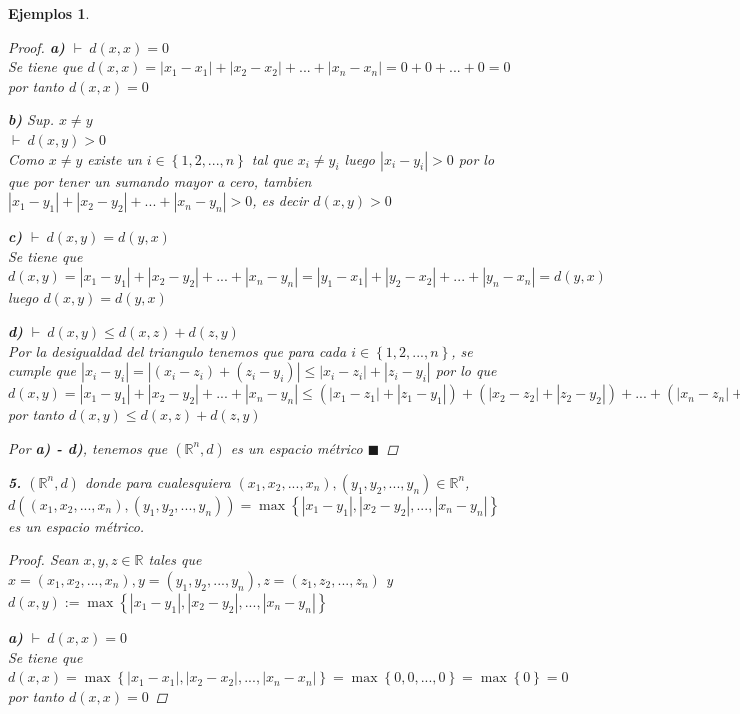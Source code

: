 \documentclass[oneside]{book} %
\theoremstyle{Teorema}
\theoremstyle{Ejemplos}
\newtheorem{Ejemplos}[Definicion]{Ejemplos}
\theoremstyle{[Obs]}
\newcommand{\abs}[1]{\left|#1\right|} %
\renewcommand{\{}{\left\lbrace} %
\renewcommand{\}}{\right\rbrace} %
\newcommand{\R}{\mathbb{R}} %
\newcommand{\Rn}{\mathbb{R}^n} %
\renewcommand{\qed}{$\blacksquare$} %
\newcommand{\pd}{$\vdash\ $} %
\begin{document}
\begin{Ejemplos}
\begin{proof}
					\textbf{a)} \pd $d(x, x) = 0$ \\
					Se tiene que $d(x, x) = \abs{x_1 - x_1} + \abs{x_2 - x_2} + ... + \abs{x_n - x_n} = 0 + 0 + ... + 0 = 0$ por tanto $d(x, x) = 0$ 

					\textbf{b)} Sup. $x \neq y$ \\
					\pd $d(x, y) > 0$ \\
					Como $x \neq y$ existe un $i \in \{ 1, 2, ..., n \}$ tal que $x_i \neq y_i$ luego $\abs{x_i - y_i} > 0$ por lo que por tener un sumando mayor a cero, tambien $\abs{x_1 - y_1} + \abs{x_2 - y_2} + ... + \abs{x_n - y_n} > 0$, es decir $d(x, y) > 0$ 

					\textbf{c)} \pd $d(x, y) = d(y, x)$ \\
					Se tiene que $d(x, y) = \abs{x_1 - y_1} + \abs{x_2 - y_2} + ... + \abs{x_n - y_n} = \abs{y_1 - x_1} + \abs{y_2 - x_2} + ... + \abs{y_n - x_n} = d(y, x)$ luego $d(x, y) = d(y, x)$ 

					\textbf{d)} \pd $d(x, y) \leq d(x, z) + d(z, y)$ \\
					Por la desigualdad del triangulo tenemos que para cada $i \in \{ 1, 2, ..., n \}$, se cumple que $\abs{x_i - y_i} = \abs{(x_i - z_i) + (z_i - y_i)} \leq \abs{x_i - z_i} + \abs{z_i - y_i}$ por lo que $d(x, y) = \abs{x_1 - y_1} + \abs{x_2 - y_2} + ... + \abs{x_n - y_n} \leq (\abs{x_1 - z_1} + \abs{z_1 - y_1}) + (\abs{x_2 - z_2} + \abs{z_2 - y_2}) + ... + (\abs{x_n - z_n} + \abs{z_n - y_n}) = (\abs{x_1 - z_1} + \abs{x_2 - z_2} + ... + \abs{x_n - z_n}) + (\abs{z_1 - y_1} + \abs{z_2 - y_2} + ... + \abs{z_n - y_n}) = d(x, z) + d(z, y)$ por tanto $d(x, y) \leq d(x, z) + d(z, y)$

					Por \textbf{a) - d)}, tenemos que $(\Rn, d)$ es un espacio métrico \qed 

				\end{proof}
				
				\textbf{5.} $(\Rn, d)$ donde para cualesquiera $(x_1, x_2, ..., x_n), (y_1, y_2, ..., y_n) \in \Rn$, $d( (x_1, x_2, ..., x_n), (y_1, y_2, ..., y_n) ) = \max\{ \abs{x_1 - y_1}, \abs{x_2 - y_2}, ..., \abs{x_n - y_n} \}$ es un espacio métrico. 

				\begin{proof}
					
					Sean $x, y, z \in \R$ tales que $x = (x_1, x_2, ..., x_n), y = (y_1, y_2, ..., y_n), z = (z_1, z_2, ..., z_n)$ y $d(x, y) := \max\{\abs{x_1 - y_1}, \abs{x_2 - y_2}, ..., \abs{x_n - y_n}\}$

					\textbf{a)} \pd $d(x, x) = 0$ \\
					Se tiene que $d(x, x) = \max\{\abs{x_1 - x_1}, \abs{x_2 - x_2}, ..., \abs{x_n - x_n}\} = \max\{ 0, 0, ..., 0 \} = \max\{ 0 \} = 0$ por tanto $d(x, x) = 0$ 


\end{proof}
\end{Ejemplos}
\end{document}
